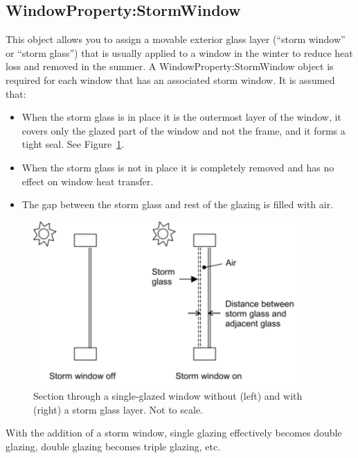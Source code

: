 \subsection{WindowProperty:StormWindow}\label{windowpropertystormwindow}

This object allows you to assign a movable exterior glass layer (``storm window'' or ``storm glass'') that is usually applied to a window in the winter to reduce heat loss and removed in the summer. A WindowProperty:StormWindow object is required for each window that has an associated storm window. It is assumed that:

\begin{itemize}
\item
  When the storm glass is in place it is the outermost layer of the window, it covers only the glazed part of the window and not the frame, and it forms a tight seal. See Figure~\ref{fig:section-through-a-single-glazed-window}.
\item
  When the storm glass is not in place it is completely removed and has no effect on window heat transfer.
\item
  The gap between the storm glass and rest of the glazing is filled with air.
\end{itemize}

\begin{figure}[hbtp] %
\centering
\includegraphics[width=0.9\textwidth, height=0.9\textheight, keepaspectratio=true]{media/image066.png}
\caption{Section through a single-glazed window without (left) and with (right) a storm glass layer. Not to scale. \protect \label{fig:section-through-a-single-glazed-window}}
\end{figure}

With the addition of a storm window, single glazing effectively becomes double glazing, double glazing becomes triple glazing, etc.

